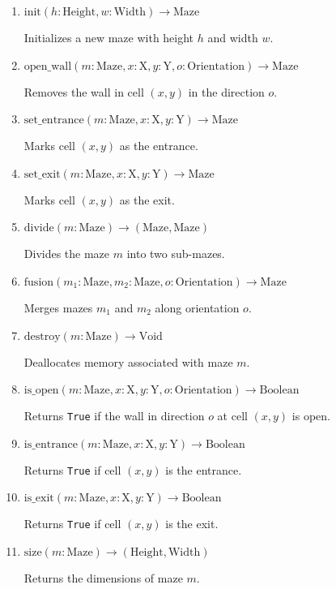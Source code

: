 \documentclass{article}
\begin{document}
\begin{enumerate}
    \item \(\text{init}(h: \text{Height}, w: \text{Width}) \rightarrow \text{Maze}\)

    Initializes a new maze with height \(h\) and width \(w\).

    \item \(\text{open\_wall}(m: \text{Maze}, x: \text{X}, y: \text{Y}, o: \text{Orientation}) \rightarrow \text{Maze}\)

    Removes the wall in cell \((x, y)\) in the direction \(o\).

    \item \(\text{set\_entrance}(m: \text{Maze}, x: \text{X}, y: \text{Y}) \rightarrow \text{Maze}\)

    Marks cell \((x, y)\) as the entrance.

    \item \(\text{set\_exit}(m: \text{Maze}, x: \text{X}, y: \text{Y}) \rightarrow \text{Maze}\)

    Marks cell \((x, y)\) as the exit.

    \item \(\text{divide}(m: \text{Maze}) \rightarrow (\text{Maze}, \text{Maze})\)

    Divides the maze \(m\) into two sub-mazes.

    \item \(\text{fusion}(m_1: \text{Maze}, m_2: \text{Maze}, o: \text{Orientation}) \rightarrow \text{Maze}\)

    Merges mazes \(m_1\) and \(m_2\) along orientation \(o\).

    \item \(\text{destroy}(m: \text{Maze}) \rightarrow \text{Void}\)

    Deallocates memory associated with maze \(m\).

    \item \(\text{is\_open}(m: \text{Maze}, x: \text{X}, y: \text{Y}, o: \text{Orientation}) \rightarrow \text{Boolean}\)

    Returns \texttt{True} if the wall in direction \(o\) at cell \((x, y)\) is open.

    \item \(\text{is\_entrance}(m: \text{Maze}, x: \text{X}, y: \text{Y}) \rightarrow \text{Boolean}\)

    Returns \texttt{True} if cell \((x, y)\) is the entrance.

    \item \(\text{is\_exit}(m: \text{Maze}, x: \text{X}, y: \text{Y}) \rightarrow \text{Boolean}\)

    Returns \texttt{True} if cell \((x, y)\) is the exit.

    \item \(\text{size}(m: \text{Maze}) \rightarrow (\text{Height}, \text{Width})\)

    Returns the dimensions of maze \(m\).
\end{enumerate}
\end{document}
